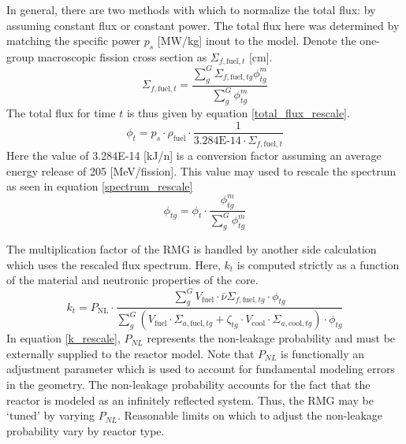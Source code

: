In general, there are two methods with which to normalize the total flux: by assuming constant flux
or constant power.  The total flux here was determined by matching the specific power $p_s$ [MW/kg] 
inout to the model.  Denote the one-group macroscopic 
fission cross section as $\Sigma_{f,\mbox{fuel},t}$ [cm].
\begin{equation}
\label{one_group_fission}
\Sigma_{f,\mbox{fuel},t} = \frac{\sum_g^G \Sigma_{f,\mbox{fuel},tg}\phi_{tg}^m}
                                {\sum_g^G \phi_{tg}^m}
\end{equation}
The total flux for time $t$ is thus given by equation \ref{total_flux_rescale}.
\begin{equation}
\label{total_flux_rescale}
\phi_t = p_s \cdot  \rho_{\mbox{fuel}} \cdot \frac{1}
                                                  {\mbox{3.284E-14} \cdot \Sigma_{f,\mbox{fuel},t}}
\end{equation}
Here the value of 3.284E-14 [kJ/n] is a conversion factor assuming an average 
energy release of 205 [MeV/fission].  This value may used to rescale the spectrum 
as seen in equation \ref{spectrum_rescale}
\begin{equation}
\label{spectrum_rescale}
\phi_{tg} = \phi_t \cdot  \frac{\phi_{tg}^m}
                               {\sum_g^G \phi_{tg}^m}
\end{equation}

The multiplication factor of the RMG is handled by another side calculation which 
uses the rescaled flux spectrum.  Here, $k_t$ is computed strictly as a function of the 
material and neutronic properties of the core.
\begin{equation}
\label{k_rescale}
k_t = P_{\mbox{NL}} \cdot \frac{\sum_g^G V_{\mbox{fuel}} \cdot \bar{\nu}\Sigma_{f,\mbox{fuel},tg} \cdot \phi_{tg}}
                                {\sum_g^G \left(V_{\mbox{fuel}} \cdot \Sigma_{a,\mbox{fuel},tg} + \zeta_{tg} \cdot V_{\mbox{cool}} \cdot \Sigma_{a,\mbox{cool},tg}\right) \cdot  \phi_{tg}}
\end{equation}
In equation \ref{k_rescale}, $P_{NL}$ represents the non-leakage probability and must be externally supplied
to the reactor model.  Note that $P_{NL}$ is functionally an adjustment parameter
which is used to account for fundamental modeling errors in the geometry.  The non-leakage 
probability accounts for the fact that the reactor is modeled as an infinitely reflected system.
Thus, the RMG may be `tuned'
by varying $P_{NL}$.  Reasonable limits on which to adjust the non-leakage probability
vary by reactor type.  


